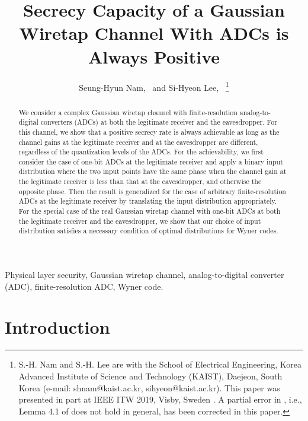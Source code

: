 \documentclass[journal]{IEEEtran}
\begin{document}
\title{Secrecy Capacity of a Gaussian Wiretap Channel With ADCs is Always Positive}

\author{Seung-Hyun Nam,~
        and Si-Hyeon Lee,~%
\thanks{S.-H. Nam and S.-H. Lee are with the School of Electrical Engineering, Korea Advanced Institute of Science and Technology (KAIST), Daejeon, South Korea (e-mail: shnam@kaist.ac.kr, sihyeon@kaist.ac.kr). This paper was presented in part at IEEE ITW 2019, Visby, Sweden \cite{Cs_real_onebit}. A partial error in \cite{Cs_real_onebit}, i.e., Lemma 4.1 of \cite{Cs_real_onebit} does not hold in general,  has been corrected in this paper. }%
}

\maketitle

    \begin{abstract}
        We consider a complex Gaussian wiretap channel with finite-resolution analog-to-digital converters (ADCs) at both the legitimate receiver and the eavesdropper.
        For this channel, we show that a positive secrecy rate is always achievable as long as the channel gains at the legitimate receiver and at the eavesdropper are different, regardless of the quantization levels of the ADCs.
        For the achievability, we first consider the case of one-bit ADCs at the legitimate receiver and apply a binary input distribution where the two input points have the same phase when the channel gain at the legitimate receiver is less than that at the eavesdropper, and otherwise the opposite phase. Then the result is generalized for the case of arbitrary finite-resolution ADCs at the legitimate receiver by translating the input distribution appropriately. For the special case of the real Gaussian wiretap channel with one-bit ADCs at both the legitimate receiver and the eavesdropper, we show that our choice of input distribution satisfies a necessary condition of optimal distributions for Wyner codes.
        \end{abstract}

\begin{IEEEkeywords}
Physical layer security, Gaussian wiretap channel, analog-to-digital converter (ADC), finite-resolution ADC, Wyner code.
\end{IEEEkeywords}


\section{Introduction}
\end{document}
